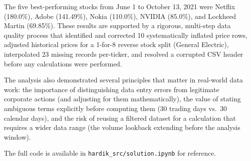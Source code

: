 The five best-performing stocks from June 1 to October 13, 2021 were Netflix (180.0\%), Adobe (141.49\%), Nokia (110.0\%), NVIDIA (85.0\%), and Lockheed Martin (69.85\%). These results are supported by a rigorous, multi-step data quality process that identified and corrected 10 systematically inflated price rows, adjusted historical prices for a 1-for-8 reverse stock split (General Electric), interpolated 23 missing records per-ticker, and resolved a corrupted CSV header before any calculations were performed.

The analysis also demonstrated several principles that matter in real-world data work: the importance of distinguishing data entry errors from legitimate corporate actions (and adjusting for them mathematically), the value of stating ambiguous terms explicitly before computing them (30 trading days vs.\ 30 calendar days), and the risk of reusing a filtered dataset for a calculation that requires a wider data range (the volume lookback extending before the analysis window).

The full code is available in \texttt{hardik\_src/solution.ipynb} for reference.

